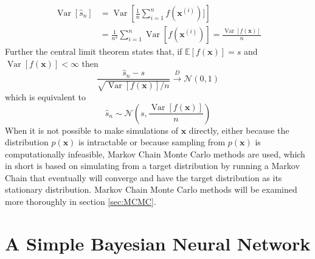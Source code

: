 \begin{equation*}
    \begin{split}
\operatorname{Var}\left[\hat{s}_{n}\right] &=\operatorname{Var}\left[\frac{1}{n} \sum_{i=1}^{n} f(\mathbf{x}^{(i)})]\right] \\ &=\frac{1}{n^{2}} \sum_{i=1}^{n} \operatorname{Var}[f(\mathbf{x}^{(i)})]
=\frac{\operatorname{Var}[f(\mathbf{x})]}{n}
\end{split}
\end{equation*}
Further the central limit theorem states that, if $\mathbb{E}[f(\mathbf{x})]=s$ and $\operatorname{Var}[f(\mathbf{x})]<\infty$ then
\begin{equation*}
    \frac{\hat{s}_{n}-s}{\sqrt{\operatorname{Var}[f(\mathbf{x})] / n}} \stackrel{D}{\rightarrow} \mathcal{N}(0,1)
\end{equation*}
which is equivalent to
\begin{equation*}
    \hat{s}_n\sim \mathcal{N}\left(s,\frac{\operatorname{Var}[f(\mathbf{x})]}{n}\right)
\end{equation*}
When it is not possible to make simulations of $\mathbf{x}$ directly, either because the distribution $p(\mathbf{x})$ is intractable or because sampling from $p(\mathbf{x})$ is computationally infeasible, Markov Chain Monte Carlo methods are used, which in short is based on simulating from a target distribution by running a Markov Chain that eventually will converge and have the target distribution as its stationary distribution. Markov Chain Monte Carlo methods will be examined more thoroughly in section \ref{sec:MCMC}.



\section{A Simple Bayesian Neural Network} \label{sec:simple_BNN}

